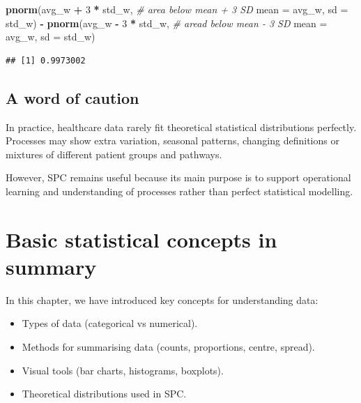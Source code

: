 \documentclass[
]{book}
\newenvironment{Shaded}{\begin{snugshade}}{\end{snugshade}}
\newcommand{\AttributeTok}[1]{\textcolor[rgb]{0.13,0.29,0.53}{#1}}
\newcommand{\CommentTok}[1]{\textcolor[rgb]{0.56,0.35,0.01}{\textit{#1}}}
\newcommand{\DecValTok}[1]{\textcolor[rgb]{0.00,0.00,0.81}{#1}}
\newcommand{\FunctionTok}[1]{\textcolor[rgb]{0.13,0.29,0.53}{\textbf{#1}}}
\newcommand{\NormalTok}[1]{#1}
\newcommand{\SpecialCharTok}[1]{\textcolor[rgb]{0.81,0.36,0.00}{\textbf{#1}}}
\providecommand{\tightlist}{%
  \setlength{\itemsep}{0pt}\setlength{\parskip}{0pt}}
\begin{document}
\begin{Shaded}
\begin{Highlighting}[]
\FunctionTok{pnorm}\NormalTok{(avg\_w }\SpecialCharTok{+} \DecValTok{3} \SpecialCharTok{*}\NormalTok{ std\_w,    }\CommentTok{\# area below mean + 3 SD}
      \AttributeTok{mean =}\NormalTok{ avg\_w,}
      \AttributeTok{sd   =}\NormalTok{ std\_w) }\SpecialCharTok{{-}} 
  \FunctionTok{pnorm}\NormalTok{(avg\_w }\SpecialCharTok{{-}} \DecValTok{3} \SpecialCharTok{*}\NormalTok{ std\_w,  }\CommentTok{\# aread below mean {-} 3 SD}
        \AttributeTok{mean =}\NormalTok{ avg\_w, }
        \AttributeTok{sd   =}\NormalTok{ std\_w)}
\end{Highlighting}
\end{Shaded}

\begin{verbatim}
## [1] 0.9973002
\end{verbatim}

\subsection{A word of caution}\label{a-word-of-caution}

In practice, healthcare data rarely fit theoretical statistical distributions perfectly. Processes may show extra variation, seasonal patterns, changing definitions or mixtures of different patient groups and pathways.

However, SPC remains useful because its main purpose is to support operational learning and understanding of processes rather than perfect statistical modelling.

\section{Basic statistical concepts in summary}\label{basic-statistical-concepts-in-summary}

In this chapter, we have introduced key concepts for understanding data:

\begin{itemize}
\tightlist
\item
  Types of data (categorical vs numerical).
\item
  Methods for summarising data (counts, proportions, centre, spread).
\item
  Visual tools (bar charts, histograms, boxplots).
\item
  Theoretical distributions used in SPC.
\end{itemize}
\end{document}
